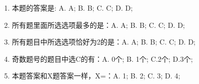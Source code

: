 \vspace{6pt}
\begin{enumerate}
\item 本题的答案是: A. A; B. B; C. C; D. D;
\item 所有题里面所选选项最多的是：A. A; B. B; C. C; D. D;
\item 所有题目中所选选项恰好为2的是：A. A; B. B; C. C; D. D;
\item 奇数题号的题目中选C的有：A. 0个; B. 1个; C.2个; D.3个;
\item 本题答案和X题答案一样，X=：A. 1; B. 2; C. 3; D. 4;
\end{enumerate}
